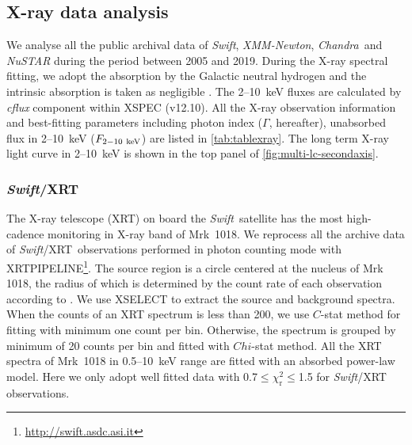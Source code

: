\documentclass[twocolumn]{aastex63}
\newcommand{\xmm}{{\em XMM-Newton}}
\newcommand{\nustar}{{\em NuSTAR }}
\newcommand{\chandra}{{\em Chandra}}
\newcommand{\swift}{{\small \it Swift}}
\newcommand{\xrt}{{\small {\it Swift}/XRT}}
\begin{document}
\subsection{X-ray data analysis}
We analyse all the public archival data of \swift, \xmm, \chandra ~and \nustar during the period between 2005 and 2019. During the X-ray spectral fitting, we adopt the absorption by the Galactic neutral hydrogen \citep[$N_{\rm{HI,Gal}}$=0.0243$\times10^{22}$cm$^{-2}$,][]{2005A&A...440..775K} and the intrinsic absorption is taken as negligible \citep[see][]{2016A&A...593L...9H}. The 2--10~keV fluxes are calculated by {\it cflux} component within {\scriptsize XSPEC} (v12.10). All the X-ray observation information and best-fitting parameters including photon index ($\Gamma$, hereafter), unabsorbed flux in 2--10~keV ($F_{\rm{2-10~keV}}$) are listed in \autoref{tab:tablexray}. The long term X-ray light curve in 2--10~keV is shown in the top panel of \autoref{fig:multi-lc-secondaxis}.


\subsubsection{\xrt\,}
\label{data-xrt}
The X-ray telescope (XRT) on board the \swift\, satellite has the most high-cadence monitoring in X-ray band of Mrk~1018. We reprocess all the archive data of \xrt\, observations performed in photon counting mode with {\scriptsize XRTPIPELINE}\footnote{\url{http://swift.asdc.asi.it}}. The source region is a circle centered at the nucleus of Mrk 1018, the radius of which is determined by the count rate of each observation according to \citet{2009MNRAS.397.1177E}. We use {\scriptsize XSELECT} to extract the source and background spectra. When the counts of an XRT spectrum is less than 200, we use $C$-stat method for fitting with minimum one count per bin. Otherwise, the spectrum is grouped by minimum of 20 counts per bin and fitted with $Chi$-stat method. All the XRT spectra of Mrk~1018 in 0.5--10~keV range are fitted with an absorbed power-law model. Here we only adopt well fitted data with 0.7$\le \chi^2_\mathrm{r} \le$1.5 for \swift/XRT observations. 
\end{document}
